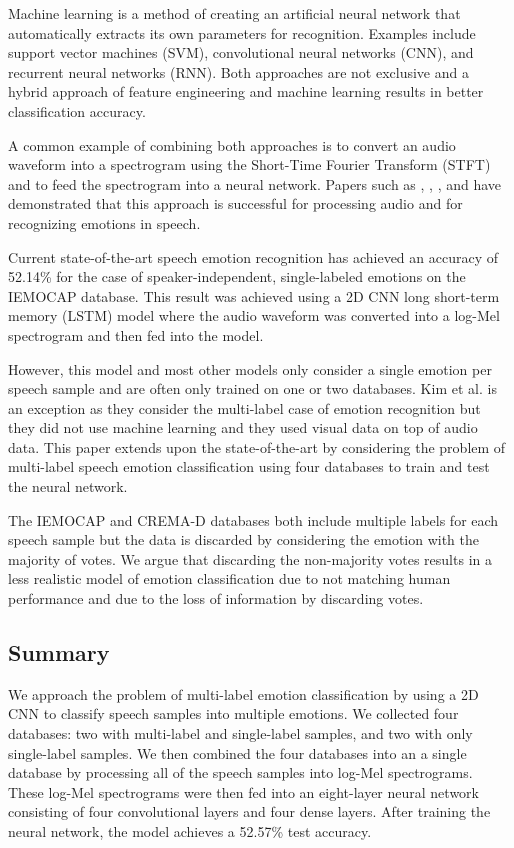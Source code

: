 \documentclass[conference]{IEEEtran}
\begin{document}
Machine learning is a method of creating an artificial neural network that automatically extracts its own parameters for recognition. Examples include support vector machines (SVM), convolutional neural networks (CNN), and recurrent neural networks (RNN). Both approaches are not exclusive and a hybrid approach of feature engineering and machine learning results in better classification accuracy.\cite{Nassif2019}

A common example of combining both approaches is to convert an audio waveform into a spectrogram using the Short-Time Fourier Transform (STFT) and to feed the spectrogram into a neural network. Papers such as \cite{Engel2019}, \cite{Chen2018}, \cite{Badshah2019}, and \cite{Zhao2019} have demonstrated that this approach is successful for processing audio and for recognizing emotions in speech.

Current state-of-the-art speech emotion recognition has achieved an accuracy of 52.14\% for the case of speaker-independent, single-labeled emotions on the IEMOCAP database.\cite{Zhao2019} This result was achieved using a 2D CNN long short-term memory (LSTM) model where the audio waveform was converted into a log-Mel spectrogram and then fed into the model.

However, this model and most other models only consider a single emotion per speech sample and are often only trained on one or two databases. Kim et al. \cite{Kim2018a} is an exception as they consider the multi-label case of emotion recognition but they did not use machine learning and they used visual data on top of audio data. This paper extends upon the state-of-the-art by considering the problem of multi-label speech emotion classification using four databases to train and test the neural network.

The IEMOCAP \cite{busso_2008} and CREMA-D \cite{cao_2014} databases both include multiple labels for each speech sample but the data is discarded by considering the emotion with the majority of votes. We argue that discarding the non-majority votes results in a less realistic model of emotion classification due to not matching human performance and due to the loss of information by discarding votes.

\subsection{Summary}

We approach the problem of multi-label emotion classification by using a 2D CNN to classify speech samples into multiple emotions. We collected four databases: two with multi-label and single-label samples, and two with only single-label samples. We then combined the four databases into an a single database by processing all of the speech samples into log-Mel spectrograms. These log-Mel spectrograms were then fed into an eight-layer neural network consisting of four convolutional layers and four dense layers. After training the neural network, the model achieves a 52.57\% test accuracy.
\end{document}
